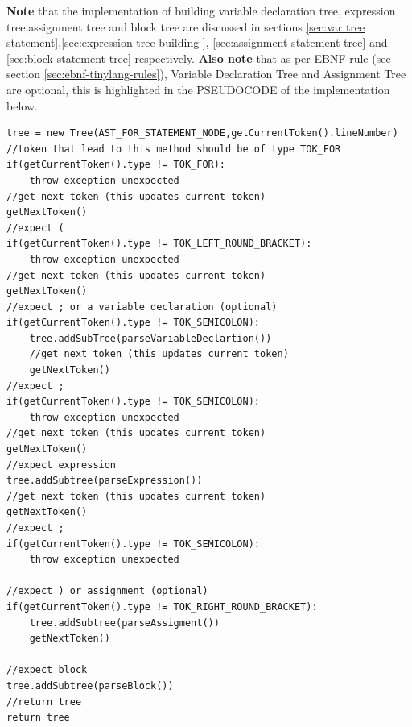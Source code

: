\textbf{Note } that the implementation of building variable declaration tree, expression tree,assignment tree and block tree are discussed in sections \ref{sec:var tree statement},\ref{sec:expression tree building }, \ref{sec:assignment statement tree} and \ref{sec:block statement tree}  respectively. \textbf{Also note} that as per EBNF rule (see section \ref{sec:ebnf-tinylang-rules}), Variable Declaration Tree and Assignment Tree are optional, this is highlighted in the PSEUDOCODE of the implementation below.
\begin{lstlisting}[caption= PSEUDOCODE for building a for statement tree (\emph{parseForStatement()})]
tree = new Tree(AST_FOR_STATEMENT_NODE,getCurrentToken().lineNumber)
//token that lead to this method should be of type TOK_FOR
if(getCurrentToken().type != TOK_FOR):
    throw exception unexpected 
//get next token (this updates current token)
getNextToken()
//expect (
if(getCurrentToken().type != TOK_LEFT_ROUND_BRACKET):
    throw exception unexpected
//get next token (this updates current token)
getNextToken()
//expect ; or a variable declaration (optional)
if(getCurrentToken().type != TOK_SEMICOLON):
    tree.addSubTree(parseVariableDeclartion())
    //get next token (this updates current token)
    getNextToken()
//expect ;
if(getCurrentToken().type != TOK_SEMICOLON):
    throw exception unexpected 
//get next token (this updates current token)
getNextToken()
//expect expression
tree.addSubtree(parseExpression())
//get next token (this updates current token)
getNextToken()
//expect ;
if(getCurrentToken().type != TOK_SEMICOLON):
    throw exception unexpected 

//expect ) or assignment (optional)
if(getCurrentToken().type != TOK_RIGHT_ROUND_BRACKET):
    tree.addSubtree(parseAssigment())
    getNextToken()

//expect block
tree.addSubtree(parseBlock())
//return tree
return tree

\end{lstlisting}










